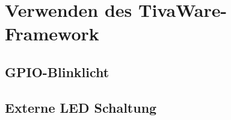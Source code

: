 \section{Verwenden des TivaWare-Framework}
\subsection{GPIO-Blinklicht}
\subsection{Externe LED Schaltung}
